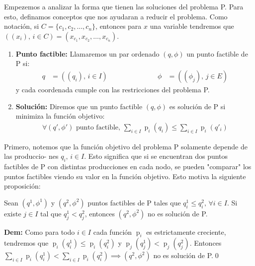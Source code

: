 \documentclass[12pt,twoside]{article}
\newenvironment{proposicion}[2][\(\blacksquare\) Proposici\'on]{\begin{trivlist}
		\item[\hskip \labelsep {\bfseries #1}\hskip \labelsep {\bfseries #2.}]}{\end{trivlist}}
\begin{document}
	\hspace{1cm}Empezemos a analizar la forma que tienen las soluciones del problema P. Para esto, definamos conceptos que nos ayudaran a reducir el problema. Como notaci\'on, si \(C=\{c_1,c_2,\dots,c_n\}\), entonces para \(x\) una variable tendremos que \(((x_i),\,i\in C)=(x_{c_1},x_{c_2},\dots,x_{c_n})\).
	
	\begin{enumerate}
		\item [(i)] \textbf{Punto factible:} Llamaremos un par ordenado \((q,\phi)\) un punto factible de P si:
		\begin{equation*}
			\begin{aligned}
				q&=((q_i),\,i \in I)&&\hspace{2cm}&\phi&=((\phi_{j}),\,j\in E)
			\end{aligned}
		\end{equation*}
		y cada coordenada cumple con las restricciones del problema P.
		\item [(ii)] \textbf{Soluci\'on:} Diremos que un punto factible \((q,\phi)\) es soluci\'on de P si minimiza la funci\'on objetivo:
		\begin{equation*}
			\begin{aligned}
				\forall (q',\phi') \text{ punto factible, }\sum_{i\in I}\operatorname{p}_i(q_i)\leq\sum_{i\in I}\operatorname{p}_i(q'_i)
			\end{aligned}
		\end{equation*}
	\end{enumerate}
	
	\hspace{1cm} Primero, notemos que la funci\'on objetivo del problema P solamente depende de las produccio- nes \(q_i,\, i\in I\). Esto significa que si se encuentran dos puntos factibles de P con distintas producciones en cada nodo, se pueden "comparar" los puntos factibles viendo su valor en la funci\'on objetivo. Esto motiva la siguiente proposici\'on:
	
	\vspace{0.4cm}
	\begin{proposicion}{1} Sean \((q^1,\phi^1)\) y \((q^2,\phi^2)\) puntos factibles de P tales que \(q^1_i\leq q^2_i,\, \forall i \in I\). Si existe \(j \in I\) tal que \(q^1_j< q^2_j\), entonces \((q^2,\phi^2)\) no es soluci\'on de P.
		
		\textbf{Dem:} Como para todo \(i \in I\) cada funci\'on \(\operatorname{p}_i\) es estrictamente creciente, tendremos que \(\operatorname{p}_i(q^1_i)\leq\operatorname{p}_i(q^2_i)\) y \(\operatorname{p}_j(q^1_j)<\operatorname{p}_j(q^2_j)\). Entonces \(\sum_{i\in I}\operatorname{p}_i(q^1_i)<\sum_{i\in I}\operatorname{p}_i(q^2_i)\implies(q^2,\phi^2)\) no es soluci\'on de P.\qed
	\end{proposicion}
	
\end{document}
